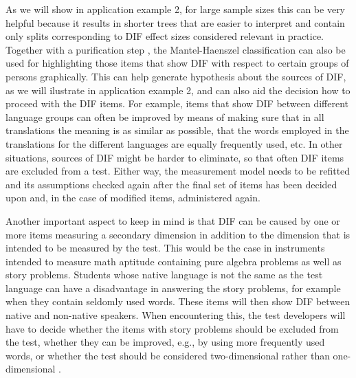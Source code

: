 \documentclass[doc,floatsintext,natbib]{apa7}
\begin{document}
As we will show in application example 2, for large sample sizes this can be very helpful because it results in shorter trees that are easier to interpret and contain only splits corresponding to DIF effect sizes considered relevant in practice. Together with a purification step \citep[see][for details]{HenDebStr:2023:EPM} , the Mantel-Haenszel classification can also be used for highlighting those items that show DIF with respect to certain groups of persons graphically. This can help generate hypothesis about the sources of DIF, as we will ilustrate in application example 2, and can also aid the decision how to proceed with the DIF items. 
For example, items that show DIF between different language groups can often be improved by means of making sure that in all translations the meaning is as similar as possible, that the words employed in the translations for the different languages are equally frequently used, etc. In other situations, sources of DIF might be harder to eliminate, so that often DIF items are excluded from a test. Either way, the measurement model needs to be refitted and its assumptions checked again after the final set of items has been decided upon and, in the case of modified items, administered again. 

Another important aspect to keep in mind is that DIF can be caused by one or more items measuring a secondary dimension in addition to the dimension that is intended to be measured by the test. This would be the case in instruments intended to measure math aptitude containing pure algebra problems as well as story problems. Students whose native language is not the same as the test language can have a disadvantage in answering the story problems, for example when they contain seldomly used words. These items will then show DIF between native and non-native speakers. When encountering this, the test developers will have to decide whether the items with story problems should be excluded from the test, whether they can be improved, e.g., by using more frequently used words, or whether the test should be considered two-dimensional rather than one-dimensional \citep[see also][for a discussion of the connection between DIF and multidimensionality]{Ack:1992,Stretal:2021:APM}.
\end{document}
